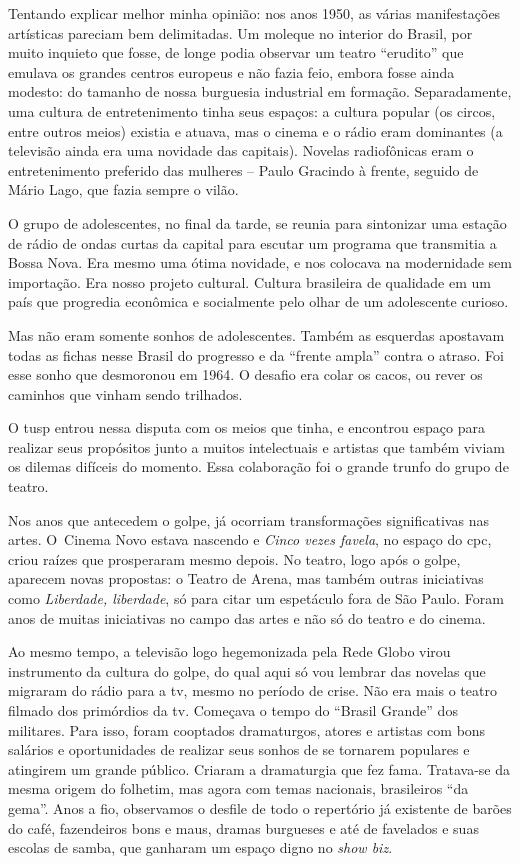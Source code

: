 Tentando explicar melhor minha opinião: nos anos 1950, as várias
manifestações artísticas pareciam bem delimitadas. Um moleque no
interior do Brasil, por muito inquieto que fosse, de longe podia
observar um teatro “erudito” que emulava os grandes centros europeus e
não fazia feio, embora fosse ainda modesto: do tamanho de nossa burguesia
industrial em formação. Separadamente, uma cultura de entretenimento
tinha seus espaços: a cultura popular (os circos, entre outros meios)
existia e atuava, mas o cinema e o rádio eram dominantes (a televisão
ainda era uma novidade das capitais). Novelas radiofônicas eram o
entretenimento preferido das mulheres -- Paulo Gracindo à frente,
seguido de Mário Lago, que fazia sempre o vilão.

O grupo de adolescentes, no final da tarde, se reunia para
sintonizar uma estação de rádio de ondas curtas da capital para escutar
um programa que transmitia a Bossa Nova. Era mesmo uma ótima novidade,
e nos colocava na modernidade sem importação. Era nosso projeto
cultural. Cultura brasileira de qualidade em um país que progredia
econômica e socialmente pelo olhar de um adolescente curioso.

Mas não eram somente sonhos de adolescentes. Também as esquerdas apostavam
todas as fichas nesse Brasil do progresso e da “frente ampla” contra o
atraso. Foi esse sonho que desmoronou em 1964. O desafio era colar os cacos,
ou rever os caminhos que vinham sendo trilhados.

O {\sc tusp} entrou nessa disputa com os meios que tinha, e
encontrou espaço para realizar seus propósitos junto a muitos
intelectuais e artistas que também viviam os dilemas difíceis do
momento. Essa colaboração foi o grande trunfo do grupo de teatro.

Nos anos que antecedem o golpe, já ocorriam transformações
significativas nas artes. O~Cinema Novo estava nascendo e {\it Cinco vezes favela},
no espaço do {\sc cpc}, criou raízes que prosperaram mesmo depois. No teatro,
logo após o golpe, aparecem novas propostas: o Teatro de Arena, mas também
outras iniciativas como {\it Liberdade, liberdade}, só para citar um
espetáculo fora de São Paulo. Foram anos de muitas iniciativas no campo
das artes e não só do teatro e do cinema.

Ao mesmo tempo, a televisão logo hegemonizada pela Rede Globo virou
instrumento da cultura do golpe, do qual aqui só vou lembrar das novelas
que migraram do rádio para a {\sc tv}, mesmo no período de crise. Não era mais o
teatro filmado dos primórdios da {\sc tv}. Começava o tempo do “Brasil
Grande” dos militares. Para isso, foram cooptados dramaturgos, atores e
artistas com bons salários e oportunidades de realizar seus sonhos de
se tornarem populares e atingirem um grande público. Criaram a
dramaturgia que fez fama. Tratava-se da mesma origem do folhetim, mas agora com temas
nacionais, brasileiros “da gema”. Anos a fio, observamos o desfile de todo o
repertório já existente de barões do café, fazendeiros bons e maus,
dramas burgueses e até de favelados e suas escolas de samba, que ganharam um
espaço digno no {\it show biz}.

